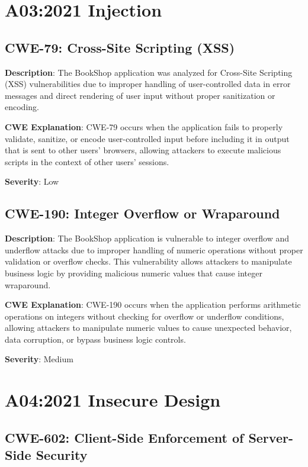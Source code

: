 \documentclass[]{UCD_CS_FYP_Report}
\begin{document}
\chapter{A03:2021 Injection}

\section{CWE-79: Cross-Site Scripting (XSS)}

\textbf{Description}: The BookShop application was analyzed for Cross-Site Scripting (XSS) vulnerabilities due to improper handling of user-controlled data in error messages and direct rendering of user input without proper sanitization or encoding.

\textbf{CWE Explanation}: CWE-79 occurs when the application fails to properly validate, sanitize, or encode user-controlled input before including it in output that is sent to other users' browsers, allowing attackers to execute malicious scripts in the context of other users' sessions.

\textbf{Severity}: Low



\section{CWE-190: Integer Overflow or Wraparound}

\textbf{Description}: The BookShop application is vulnerable to integer overflow and underflow attacks due to improper handling of numeric operations without proper validation or overflow checks. This vulnerability allows attackers to manipulate business logic by providing malicious numeric values that cause integer wraparound.

\textbf{CWE Explanation}: CWE-190 occurs when the application performs arithmetic operations on integers without checking for overflow or underflow conditions, allowing attackers to manipulate numeric values to cause unexpected behavior, data corruption, or bypass business logic controls.

\textbf{Severity}: Medium



\chapter{A04:2021 Insecure Design}

\section{CWE-602: Client-Side Enforcement of Server-Side Security}
\end{document}
